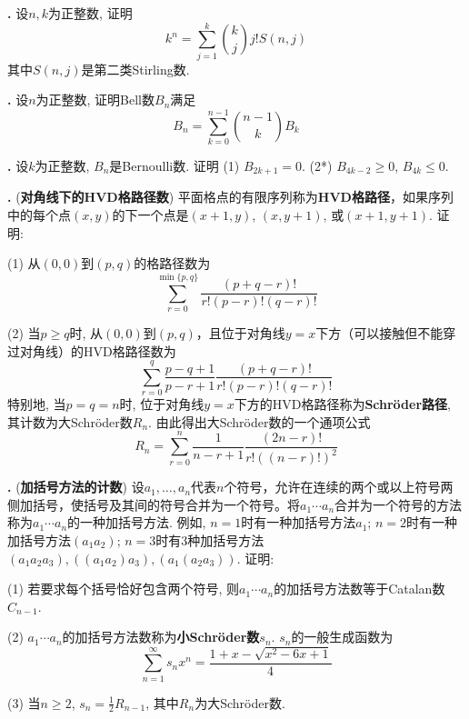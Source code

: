 \par \textbf{\theprobenum .} \cite{IC} 设$n,k$为正整数, 证明
\begin{equation}
    k^n = \sum_{j=1}^k \binom{k}{j} j! S(n,j) 
\end{equation}
其中$S(n,j)$是第二类Stirling数. 

\par \textbf{\theprobenum .} \cite{IC} 设$n$为正整数, 证明Bell数$B_n$满足
\begin{equation}
    B_n = \sum_{k=0}^{n-1} \binom{n-1}{k} B_{k}
\end{equation}

\par \textbf{\theprobenum .} 设$k$为正整数, $B_n$是Bernoulli数. 证明
(1) $B_{2k+1}=0$. (2*) $B_{4k-2}\ge 0$, $B_{4k}\le 0$.

\par \textbf{\theprobenum .} (\textbf{对角线下的HVD格路径数}) 平面格点的有限序列称为\textbf{HVD格路径}，如果序列中的每个点$(x,y)$的下一个点是$(x+1,y)$, $(x,y+1)$, 或$(x+1,y+1)$. 证明:
\par (1) 从$(0,0)$到$(p,q)$的格路径数为
\begin{equation}
    \sum_{r=0}^{\min \{p,q\}} \frac{(p+q-r)!}{r!(p-r)!(q-r)!}
\end{equation}
\par (2) 当$p\ge q$时, 从$(0,0)$到$(p,q)$，且位于对角线$y=x$下方（可以接触但不能穿过对角线）的HVD格路径数为
\begin{equation}
    \sum_{r=0}^{q} \frac{p-q+1}{p-r+1} \frac{(p+q-r)!}{r!(p-r)!(q-r)!}
\end{equation}
特别地, 当$p=q=n$时, 位于对角线$y=x$下方的HVD格路径称为\textbf{Schröder路径}, 其计数为大Schröder数$R_n$. 由此得出大Schröder数的一个通项公式
\begin{equation}
    R_n = \sum_{r=0}^{n} \frac{1}{n-r+1} \frac{(2n-r)!}{r!((n-r)!)^2}
\end{equation}

\par \textbf{\theprobenum .} (\textbf{加括号方法的计数}) 设$a_1,\dots,a_n$代表$n$个符号，允许在连续的两个或以上符号两侧加括号，使括号及其间的符号合并为一个符号。将$a_1\cdots a_n$合并为一个符号的方法称为$a_1\cdots a_n$的一种加括号方法. 例如, $n=1$时有一种加括号方法$a_1$; $n=2$时有一种加括号方法$(a_1a_2)$; $n=3$时有3种加括号方法$(a_1a_2a_3),((a_1a_2)a_3),(a_1(a_2a_3))$. 证明:
\par (1) 若要求每个括号恰好包含两个符号, 则$a_1\cdots a_n$的加括号方法数等于Catalan数$C_{n-1}$. 
\par (2) $a_1\cdots a_n$的加括号方法数称为\textbf{小Schröder数}$s_n$. $s_n$的一般生成函数为
\begin{equation}
    \sum_{n=1}^\infty s_nx^n = \frac{1+x - \sqrt{x^2-6x+1}}{4}
\end{equation}
\par (3) 当$n\ge 2$, $s_n=\frac{1}{2}R_{n-1}$, 其中$R_n$为大Schröder数. 

